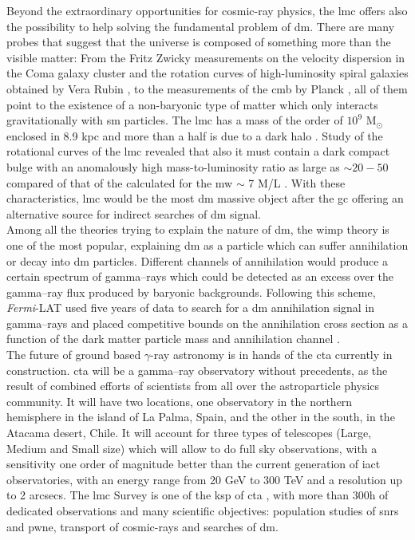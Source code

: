 \documentclass{article}
\begin{document}
Beyond the extraordinary opportunities for cosmic-ray physics, the \gls{lmc} offers also the possibility to help solving the fundamental problem of \gls{dm}. There are many probes that suggest that the universe is composed of something more than the visible matter: From the Fritz Zwicky measurements on the velocity dispersion in the Coma galaxy cluster \cite{Zwicky} and the rotation curves of high-luminosity spiral galaxies obtained by Vera Rubin \cite{1978Rubin}, to the measurements of the \gls{cmb} by Planck \cite{2014Planck}, all of them point to the existence of a non-baryonic type of matter which only interacts gravitationally with \gls{sm} particles. The \gls{lmc} has a mass of the order of $10^9$ M$_{\odot}$ enclosed in 8.9 kpc and more than a half is due to a dark halo \cite{2002LMCkinematics}. Study of the rotational curves of the \gls{lmc} revealed that also it must contain a dark compact bulge with an anomalously high mass-to-luminosity ratio as large as $\sim 20-50$ \cite{1999LMCbulge} compared of that of the calculated for the \gls{mw} $\sim$ 7 M/L \cite{2013MWbulge}. With these characteristics, \gls{lmc} would be the most \gls{dm} massive object after the \gls{gc} offering an alternative source for indirect searches of \gls{dm} signal.\\
Among all the theories trying to explain the nature of \gls{dm}, the \gls{wimp} theory is one of the most popular, explaining \gls{dm} as a particle which can suffer annihilation or decay into \gls{dm} particles. Different channels of annihilation would produce a certain spectrum of gamma--rays \cite{2011cirelli} which could be detected as an excess over the gamma--ray flux produced by baryonic backgrounds. Following this scheme, \textit{Fermi}-LAT used five years of data to search for a \gls{dm} annihilation signal in gamma--rays and placed competitive bounds on the annihilation cross section as a function of the dark matter particle mass and annihilation channel \cite{2010FermiLATLMC11months}.\\
The future of ground based $\gamma$-ray astronomy is in hands of the \gls{cta} currently in construction. \gls{cta} will be a gamma--ray observatory without precedents, as the result of combined efforts of scientists from all over the astroparticle physics community. It will have two locations, one observatory in the northern hemisphere in the island of La Palma, Spain, and the other in the south, in the Atacama desert, Chile. It will account for three types of telescopes (Large, Medium and Small size) which will allow to do full sky observations, with a sensitivity one order of magnitude better than the current generation of \gls{iact} observatories, with an energy range from 20 GeV to 300 TeV and a resolution up to 2 arcsecs. The \gls{lmc} Survey is one of the \gls{ksp} of \gls{cta} \cite{2019SciencewithCTA}, with more than 300h of dedicated observations and many scientific objectives: population studies of \glspl{snr} and \gls{pwne}, transport of cosmic-rays and searches of \gls{dm}. 
\end{document}
